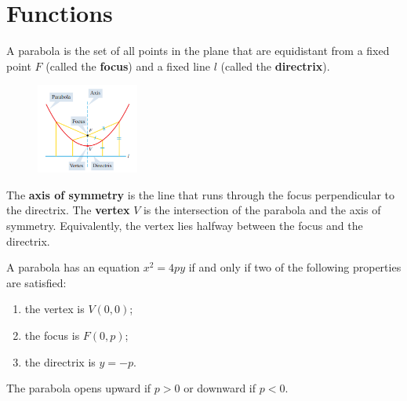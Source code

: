 
\section{Functions}


\begin{definition}[Function]

    A parabola is the set of all points in the plane that are equidistant from a fixed point $F$ (called the \textbf{focus}) and a fixed line $l$ (called the \textbf{directrix}).
\end{definition}
\begin{figure}
    \centering
    \includegraphics[width=0.3\textwidth,keepaspectratio]{figs/parabola-concepts.png}
\end{figure}
The \textbf{axis of symmetry} is the line that runs through the focus perpendicular to the directrix. The \textbf{vertex} $V$ is the intersection of the parabola and the axis of symmetry. Equivalently, the vertex lies halfway between the focus and the directrix.

\begin{theorem}
    A parabola has an equation $x^2=4py$ if and only if two of the following properties are satisfied:
    \begin{enumerate}[sepno]
        \item the vertex is $V(0, 0)$;
        \item the focus is $F(0, p)$;
        \item the directrix is $y=-p$.
    \end{enumerate}

    The parabola opens upward if $p>0$ or downward if $p<0$.
\end{theorem}

